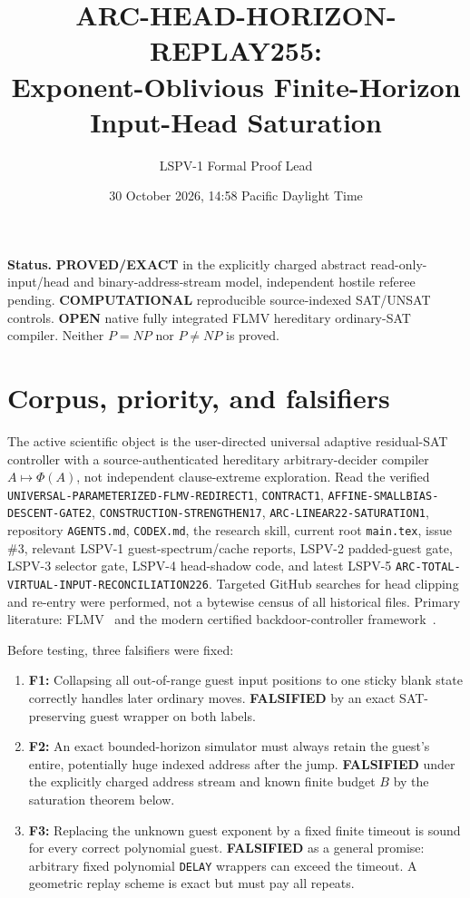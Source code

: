 \documentclass[11pt]{article}
\title{ARC-HEAD-HORIZON-REPLAY255:\\
Exponent-Oblivious Finite-Horizon Input-Head Saturation}
\author{LSPV-1 Formal Proof Lead}
\date{30 October 2026, 14:58 Pacific Daylight Time}
\begin{document}
\maketitle
\noindent\textbf{Status.} \textbf{PROVED/EXACT} in the explicitly charged abstract read-only-input/head and binary-address-stream model, independent hostile referee pending. \textbf{COMPUTATIONAL} reproducible source-indexed SAT/UNSAT controls. \textbf{OPEN} native fully integrated FLMV hereditary ordinary-SAT compiler. Neither $P=NP$ nor $P\ne NP$ is proved.

\section{Corpus, priority, and falsifiers}
The active scientific object is the user-directed universal adaptive residual-SAT controller with a source-authenticated hereditary arbitrary-decider compiler $A\mapsto\Phi(A)$, not independent clause-extreme exploration. Read the verified \texttt{UNIVERSAL-PARAMETERIZED-FLMV-REDIRECT1}, \texttt{CONTRACT1}, \texttt{AFFINE-SMALLBIAS-DESCENT-GATE2}, \texttt{CONSTRUCTION-STRENGTHEN17}, \texttt{ARC-LINEAR22-SATURATION1}, repository \texttt{AGENTS.md}, \texttt{CODEX.md}, the research skill, current root \texttt{main.tex}, issue \#3, relevant LSPV-1 guest-spectrum/cache reports, LSPV-2 padded-guest gate, LSPV-3 selector gate, LSPV-4 head-shadow code, and latest LSPV-5 \texttt{ARC-TOTAL-VIRTUAL-INPUT-RECONCILIATION226}. Targeted GitHub searches for head clipping and re-entry were performed, not a bytewise census of all historical files. Primary literature: FLMV~\cite{FLMV} and the modern certified backdoor-controller framework~\cite{DOS}.

Before testing, three falsifiers were fixed:
\begin{enumerate}
\item[] \textbf{F1:} Collapsing all out-of-range guest input positions to one sticky blank state correctly handles later ordinary moves. \textbf{FALSIFIED} by an exact SAT-preserving guest wrapper on both labels.
\item[] \textbf{F2:} An exact bounded-horizon simulator must always retain the guest's entire, potentially huge indexed address after the jump. \textbf{FALSIFIED} under the explicitly charged address stream and known finite budget $B$ by the saturation theorem below.
\item[] \textbf{F3:} Replacing the unknown guest exponent by a fixed finite timeout is sound for every correct polynomial guest. \textbf{FALSIFIED} as a general promise: arbitrary fixed polynomial \texttt{DELAY} wrappers can exceed the timeout. A geometric replay scheme is exact but must pay all repeats.
\end{enumerate}
\end{document}
